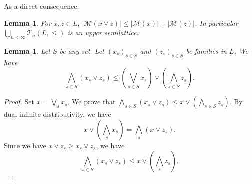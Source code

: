 \documentclass{article}
\newtheorem{lemma}[theorem]{Lemma}
\begin{document}
{As a direct consequence:}

\begin{lemma}\label{lemma.subadditivity.type}
For $x, z \in L$, $|\mathcal{M}(x \vee z)| \le |\mathcal{M}(x)| + |\mathcal{M}(z)|$. In particular $\bigcup_{n < \infty} \mathcal{T}_n(L,\le)$ is an upper semilattice.
\end{lemma}




\begin{lemma}\label{lemma.minmax}
Let \(S\) be any set. Let \((x_s)_{s \in S}\) and \((z_s)_{s \in S}\) be families in \(L\). We have 
\[\bigwedge_{s \in S} (x_s \vee z_s) \leq(\bigvee_{s \in S} x_s)\vee(\bigwedge_{s \in S} z_s).\]
\end{lemma}

\begin{proof}
    {Set $x = \bigvee_s x_s$. We prove that $\bigwedge_{s \in S} (x_s \vee z_s) \le x \vee \left( \bigwedge_{s \in S} z_s\right)$. By dual infinite distributivity,
    we have \[x \vee \left( \bigwedge_s x_s\right) = \bigwedge_s (x \vee z_s).\]
    Since we have $x \vee z_s \ge x_s \vee z_s$, 
    we have 
    \[\bigwedge_{s \in S} (x_s \vee z_s) \le x \vee \left(\bigwedge_{s} z_s\right).\]}
\end{proof}
\end{document}
